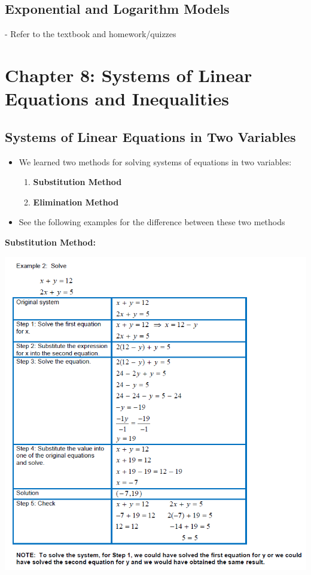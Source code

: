 \documentclass[12pt]{article}
\begin{document}
\subsection{Exponential and Logarithm Models}

- Refer to the textbook and homework/quizzes

\newpage

\section{Chapter 8: Systems of Linear Equations and Inequalities}

\subsection{Systems of Linear Equations in Two Variables}

\begin{itemize}
\item We learned two methods for solving systems of equations in two variables:
\begin{enumerate}
\item \textbf{Substitution Method}
\item \textbf{Elimination Method}
\end{enumerate}

\item See the following examples for the difference between these two methods
\end{itemize}

\textbf{Substitution Method:}

\centerline{\includegraphics[scale = 0.9]{Substitution.png}}
\end{document}
